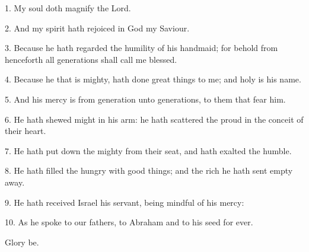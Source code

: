 1. My soul doth magnify the Lord.

2. And my spirit hath rejoiced in God my Saviour.

3. Because he hath regarded the humility of his handmaid; for behold from henceforth all generations shall call me blessed.

4. Because he that is mighty, hath done great things to me; and holy is his name.

5. And his mercy is from generation unto generations, to them that fear him.

6. He hath shewed might in his arm: he hath scattered the proud in the conceit of their heart.

7. He hath put down the mighty from their seat, and hath exalted the humble.

8. He hath filled the hungry with good things; and the rich he hath sent empty away.

9. He hath received Israel his servant, being mindful of his mercy: 

10. As he spoke to our fathers, to Abraham and to his seed for ever. 

Glory be.